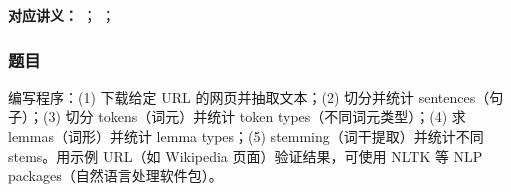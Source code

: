 
\textbf{对应讲义：}
；
；

\subsubsection*{题目}

编写程序：(1) 下载给定 URL 的网页并抽取文本；(2) 切分并统计 sentences（句子）；(3) 切分 tokens（词元）并统计 token types（不同词元类型）；(4) 求 lemmas（词形）并统计 lemma types；(5) stemming（词干提取）并统计不同 stems。用示例 URL（如 Wikipedia 页面）验证结果，可使用 NLTK 等 NLP packages（自然语言处理软件包）。

